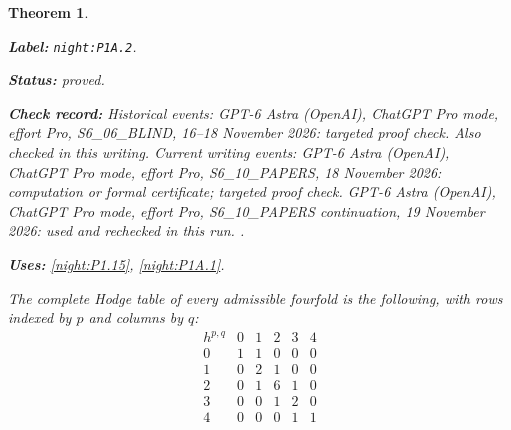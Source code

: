 \documentclass[11pt,a4paper]{article}
\newtheorem{theorem}{Theorem}[section]
\theoremstyle{definition}
\newcommand{\StatementRecord}[4]{\par\smallskip\begingroup\upshape\raggedright\noindent\textbf{Label:} \nolinkurl{#1}.\par\noindent\textbf{Status:} #2.\par\noindent\textbf{Check record:} #3.\par\noindent\textbf{Uses:} #4.\par\endgroup\smallskip}
\begin{document}
\begin{theorem}\label{night:P1A.2}
\StatementRecord{night:P1A.2}{proved}{Historical events: GPT-6 Astra (OpenAI), ChatGPT Pro mode, effort Pro, S6\_06\_BLIND, 16--18 November 2026: targeted proof check. Also checked in this writing. Current writing events: GPT-6 Astra (OpenAI), ChatGPT Pro mode, effort Pro, S6\_10\_PAPERS, 18 November 2026: computation or formal certificate; targeted proof check. GPT-6 Astra (OpenAI), ChatGPT Pro mode, effort Pro, S6\_10\_PAPERS continuation, 19 November 2026: used and rechecked in this run. }{\cref{night:P1.15}, \cref{night:P1A.1}}
The complete Hodge table of every admissible fourfold is the
following, with rows indexed by $p$ and columns by $q$:
\[
\begin{array}{c|ccccc}
h^{p,q}&0&1&2&3&4\\\hline
0&1&1&0&0&0\\
1&0&2&1&0&0\\
2&0&1&6&1&0\\
3&0&0&1&2&0\\
4&0&0&0&1&1
\end{array}
\]
\end{theorem}
\end{document}
